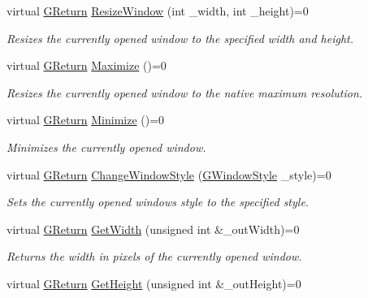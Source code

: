 \begin{DoxyCompactItemize}
virtual \mbox{\hyperlink{namespaceGW_a67a839e3df7ea8a5c5686613a7a3de21}{G\+Return}} \mbox{\hyperlink{classGW_1_1SYSTEM_1_1GWindow_a92633707248f32e4c166f27f03690d6d}{Resize\+Window}} (int \+\_\+width, int \+\_\+height)=0
\begin{DoxyCompactList}\small\item\em Resizes the currently opened window to the specified width and height. \end{DoxyCompactList}\item 
virtual \mbox{\hyperlink{namespaceGW_a67a839e3df7ea8a5c5686613a7a3de21}{G\+Return}} \mbox{\hyperlink{classGW_1_1SYSTEM_1_1GWindow_a06b5f092e742baca82a0bfc2cbaef153}{Maximize}} ()=0
\begin{DoxyCompactList}\small\item\em Resizes the currently opened window to the native maximum resolution. \end{DoxyCompactList}\item 
virtual \mbox{\hyperlink{namespaceGW_a67a839e3df7ea8a5c5686613a7a3de21}{G\+Return}} \mbox{\hyperlink{classGW_1_1SYSTEM_1_1GWindow_a2cced61a323dac10535904c3899563d8}{Minimize}} ()=0
\begin{DoxyCompactList}\small\item\em Minimizes the currently opened window. \end{DoxyCompactList}\item 
virtual \mbox{\hyperlink{namespaceGW_a67a839e3df7ea8a5c5686613a7a3de21}{G\+Return}} \mbox{\hyperlink{classGW_1_1SYSTEM_1_1GWindow_a21533c58e920d347c377ebdaa6d2b76f}{Change\+Window\+Style}} (\mbox{\hyperlink{namespaceGW_1_1SYSTEM_ad117891e556631f842625c348d36a071}{G\+Window\+Style}} \+\_\+style)=0
\begin{DoxyCompactList}\small\item\em Sets the currently opened window\textquotesingle{}s style to the specified style. \end{DoxyCompactList}\item 
virtual \mbox{\hyperlink{namespaceGW_a67a839e3df7ea8a5c5686613a7a3de21}{G\+Return}} \mbox{\hyperlink{classGW_1_1SYSTEM_1_1GWindow_a75672fb359ee44c5e551ee6223a10bdb}{Get\+Width}} (unsigned int \&\+\_\+out\+Width)=0
\begin{DoxyCompactList}\small\item\em Returns the width in pixels of the currently opened window. \end{DoxyCompactList}\item 
virtual \mbox{\hyperlink{namespaceGW_a67a839e3df7ea8a5c5686613a7a3de21}{G\+Return}} \mbox{\hyperlink{classGW_1_1SYSTEM_1_1GWindow_aab8f7e74d8554f309a7785216ff89ff3}{Get\+Height}} (unsigned int \&\+\_\+out\+Height)=0

\end{DoxyCompactItemize}
